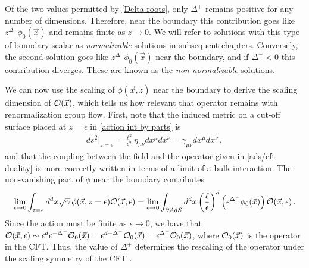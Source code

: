 \documentclass[../PhD.tex]{subfiles}
\begin{document}
Of the two values permitted by \eqref{Delta roots}, only $\Delta^+$ remains positive for any number of dimensions. Therefore, near the boundary this contribution goes like $z^{\Delta^+} \phi_0 (\vec x)$ and remains finite as $z \to 0$. We will refer to solutions with this type of boundary scalar as \emph{normalizable} solutions in subsequent chapters. Conversely, the second solution goes like $z^{\Delta^-} \phi_0 (\vec x)$ near the boundary, and if $\Delta^- < 0$ this contribution diverges. These are known as the \emph{non-normalizable} solutions. 

We can now use the scaling of $\phi(\vec x, z)$ near the boundary to derive the scaling dimension of $\mathcal O (\vec x)$, which tells us how relevant that operator remains with renormalization group flow. First, note that the induced metric on a cut-off surface placed at $z=\epsilon$ in \eqref{action int by parts} is
\begin{align}
ds^2 \Big|_{z=\epsilon} = \frac{\ell^2}{\epsilon^2} \eta_{\mu \nu} dx^\mu dx^\nu = \gamma_{\mu \nu} dx^\mu dx^\nu \, ,
\end{align}
and that the coupling between the field and the operator given in \eqref{ads/cft duality} is more correctly written in terms of a limit of a bulk interaction. The non-vanishing part of $\phi$ near the boundary contributes
\begin{align}
\lim_{\epsilon \to 0} \int_{z=\epsilon} d^{d}x \sqrt{\gamma} \, \phi(\vec x, z = \epsilon) \mathcal O(\vec x, \epsilon) = \lim_{\epsilon \to 0} \int_{\partial AdS} d^d x \left(\frac{\ell}{\epsilon}\right)^d \left( \epsilon^{\Delta^-} \phi_0 (\vec x) \right) \mathcal O (\vec x, \epsilon) \, .
\end{align}
Since the action must be finite as $\epsilon \to 0$, we have that $ \mathcal O(\vec x, \epsilon) \sim \epsilon^{d} \epsilon^{-\Delta^-} \mathcal O_0 (\vec x) = \epsilon^{d - \Delta^-} \mathcal O_0 (\vec x) = \epsilon^{\Delta^+} \mathcal O_0 (\vec x)$, where $\mathcal O_0(\vec x)$ is the operator in the CFT. Thus, the value of  $\Delta^+$ determines the rescaling of the operator under the scaling symmetry of the CFT \cite{0908.0333}.
\end{document}
